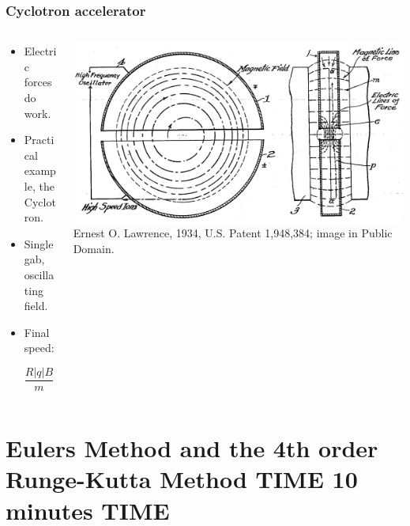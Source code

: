 \documentclass{beamer}
\begin{document}
\begin{frame}
\frametitle{Cyclotron accelerator}
\begin{columns}
\begin{column}{0.5\linewidth}
\begin{itemize}
\item<1-> Electric forces do work.

\item<2-> Practical example, the Cyclotron.

\item<3-> Single gab, oscillating field.

\item<4-> Final speed:

\begin{equation*}
\frac{R|q|B}{m} = v_\perp
\end{equation*}

\end{itemize}
\end{column}
\begin{column}{0.5\linewidth}
\includegraphics[width=\linewidth]{ Cyclotron_patent.png}
{\color{gray} Ernest O. Lawrence, 1934, U.S. Patent 1,948,384; image in Public Domain.}
\end{column}
\end{columns}
\end{frame}

\section{Eulers Method and the 4th order Runge-Kutta Method TIME 10 minutes TIME}
\end{document}
